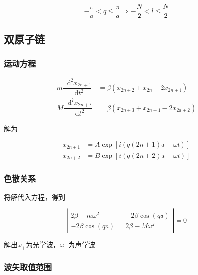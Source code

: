 \documentclass{article}
\newcommand*{\md}{\mathop{}\!\mathrm{d}}
\begin{document}
\begin{multicols}{2}
\begin{equation*}
  - \dfrac{\pi}{a} < q \leq \dfrac{\pi}{a} \Rightarrow - \dfrac{N}{2} < l \leq \dfrac{N}{2}
\end{equation*}

\subsection{双原子链}

\subsubsection{运动方程}

\begin{equation*}
  \begin{aligned}
    m \dfrac{\md^2 x_{2n+1}}{\md t^2} &= \beta \left( x_{2n+2} + x_{2n} - 2 x_{2n+1} \right) \\
    M \dfrac{\md^2 x_{2n+2}}{\md t^2} &= \beta \left( x_{2n+3} + x_{2n+1} - 2 x_{2n+2} \right)
  \end{aligned}
\end{equation*}

解为

\begin{equation*}
  \begin{aligned}
    x_{2n+1} &= A \exp \left[ i \left( q \left( 2n+1 \right)a-\omega t \right) \right] \\
    x_{2n+2} &= B \exp \left[ i \left( q \left( 2n+2 \right)a-\omega t \right) \right]
  \end{aligned}
\end{equation*}

\subsubsection{色散关系}

将解代入方程，得到

\begin{equation*}
  \left|
    \begin{aligned}
      2\beta - m \omega^2 && -2\beta \cos \left( qa \right) \\
      -2\beta \cos \left( qa \right) && 2\beta -M\omega^2
    \end{aligned}
  \right| =0 
\end{equation*}

解出$\omega_+$为光学波，$\omega_-$为声学波

\subsubsection{波矢取值范围}


\end{multicols}
\end{document}
